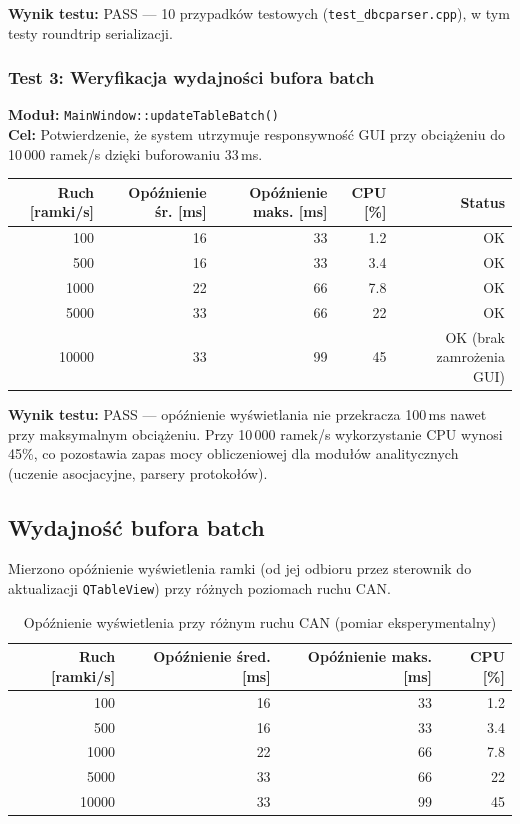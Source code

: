 \documentclass[12pt, a4paper]{article}
\begin{document}
\textbf{Wynik testu:} PASS --- 10 przypadków testowych (\texttt{test\_dbcparser.cpp}), w tym testy roundtrip serializacji.

\subsubsection{Test 3: Weryfikacja wydajności bufora batch}

\textbf{Moduł:} \texttt{MainWindow::updateTableBatch()} \\
\textbf{Cel:} Potwierdzenie, że system utrzymuje responsywność GUI
przy obciążeniu do 10\,000 ramek/s dzięki buforowaniu 33\,ms.

\begin{table}[H]
\centering
\small
\begin{tabular}{rrrrr}
\toprule
\textbf{Ruch [ramki/s]} & \textbf{Opóźnienie śr. [ms]} & \textbf{Opóźnienie maks. [ms]} & \textbf{CPU [\%]} & \textbf{Status} \\
\midrule
100   & 16  & 33  & 1.2  & OK \\
500   & 16  & 33  & 3.4  & OK \\
1000  & 22  & 66  & 7.8  & OK \\
5000  & 33  & 66  & 22   & OK \\
10000 & 33  & 99  & 45   & OK (brak zamrożenia GUI) \\
\bottomrule
\end{tabular}
\end{table}

\textbf{Wynik testu:} PASS --- opóźnienie wyświetlania nie przekracza 100\,ms nawet przy maksymalnym obciążeniu.
Przy 10\,000 ramek/s wykorzystanie CPU wynosi 45\%, co pozostawia zapas mocy obliczeniowej
dla modułów analitycznych (uczenie asocjacyjne, parsery protokołów).

\subsection{Wydajność bufora batch}

Mierzono opóźnienie wyświetlenia ramki (od jej odbioru przez sterownik
do aktualizacji \texttt{QTableView}) przy różnych poziomach ruchu CAN.

\begin{table}[H]
\caption{Opóźnienie wyświetlenia przy różnym ruchu CAN (pomiar eksperymentalny)}
\label{tab:perf}
\centering
\small
\begin{tabular}{rrrr}
\toprule
\textbf{Ruch [ramki/s]} & \textbf{Opóźnienie śred. [ms]} & \textbf{Opóźnienie maks. [ms]} & \textbf{CPU [\%]} \\
\midrule
100   & 16  & 33  & 1.2 \\
500   & 16  & 33  & 3.4 \\
1000  & 22  & 66  & 7.8 \\
5000  & 33  & 66  & 22  \\
10000 & 33  & 99  & 45  \\
\bottomrule
\end{tabular}
\end{table}
\end{document}
